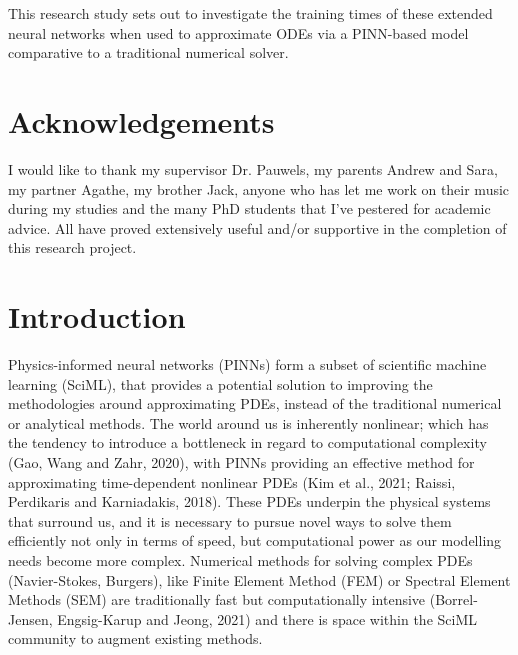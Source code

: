 \documentclass[12pt, openany]{book}
\begin{document}
This research study sets out to investigate the training times of these extended neural networks when used to approximate ODEs via a PINN-based model comparative to a traditional numerical solver.

\thispagestyle{empty}
\chapter*{Acknowledgements}

I would like to thank my supervisor Dr. Pauwels, my parents Andrew and Sara, my partner Agathe, my brother Jack, anyone who has let me work on their music during my studies and the many PhD students that I've pestered for academic advice. All have proved extensively useful and/or supportive in the completion of this research project. \\


\thispagestyle{empty}
\tableofcontents
\newpage


\chapter{Introduction}

Physics-informed neural networks (PINNs) form a subset of scientific machine learning (SciML), that provides a potential solution to improving the methodologies around approximating PDEs, instead of the traditional numerical or analytical methods. The world around us is inherently nonlinear; which has the tendency to introduce a bottleneck in regard to computational complexity (Gao, Wang and Zahr, 2020), with PINNs providing an effective method for approximating time-dependent nonlinear PDEs (Kim et al., 2021; Raissi, Perdikaris and Karniadakis, 2018). These PDEs underpin the physical systems that surround us, and it is necessary to pursue novel ways to solve them efficiently not only in terms of speed, but computational power as our modelling needs become more complex. Numerical methods for solving complex PDEs (Navier-Stokes, Burgers), like Finite Element Method (FEM) or Spectral Element Methods (SEM) are traditionally fast but computationally intensive (Borrel-Jensen, Engsig-Karup and Jeong, 2021) and there is space within the SciML community to augment existing methods. \vspace{13pt}
\end{document}
